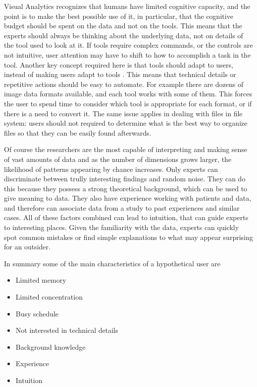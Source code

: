 Visual Analytics recognizes that humans have limited cognitive capacity, and the point is to make the best possible use of it, in particular, that the cognitive budget should be spent on the data and not on the tools. This means that the experts should always be thinking about the underlying data, not on details of the tool used to look at it. If tools require complex commands, or the controls are not intuitive, user attention may have to shift to how to accomplish a task in the tool. Another key concept required here is that tools should adapt to users, instead of making users adapt to tools \autocite{norman_design_2002}. This means that technical details or repetitive actions should be easy to automate. For example there are dozens of image data formats available, and each tool works with some of them. This forces the user to spend time to consider which tool is appropriate for each format, or if there is a need to convert it. The same issue applies in dealing with files in file system: users should not required to determine what is the best way to organize files so that they can be easily found afterwards. 

Of course the researchers are the most capable of interpreting and making sense of  vast amounts of data and as the number of dimensions grows larger, the likelihood of patterns appearing by chance increases. Only experts can discriminate between trully interesting findings and random noise. They can do this because they possess a strong theoretical background, which can be used to give meaning to data. They also have experience working with patients and data, and therefore can associate data from a study to past experiences and similar cases. All of these factors combined can lead to  intuition, that can guide experts to interesting places. Given the familiarity with the data, experts can quickly spot common mistakes or find simple explanations to what may appear surprising for an outsider. 

In summary some of the main characteristics of a hypothetical user are

\begin{itemize}
\item Limited memory
\item Limited concentration
\item Busy schedule
\item Not interested in technical details
\item Background knowledge
\item Experience
\item Intuition
\end{itemize}

